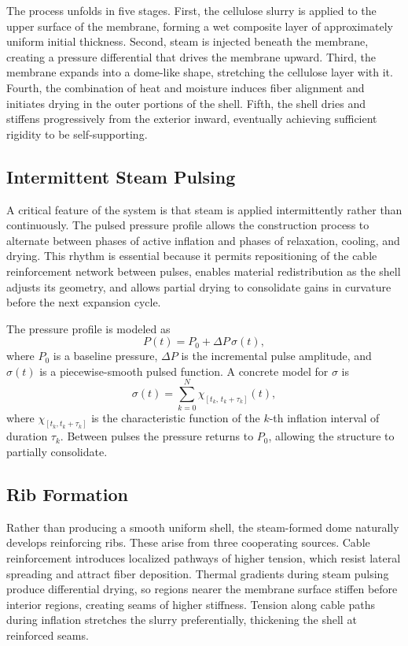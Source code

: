 \documentclass[12pt,a4paper]{article}
\begin{document}
The process unfolds in five stages. First, the cellulose slurry is
applied to the upper surface of the membrane, forming a wet composite
layer of approximately uniform initial thickness. Second, steam is
injected beneath the membrane, creating a pressure differential that
drives the membrane upward. Third, the membrane expands into a
dome-like shape, stretching the cellulose layer with it. Fourth,
the combination of heat and moisture induces fiber alignment and
initiates drying in the outer portions of the shell. Fifth, the shell
dries and stiffens progressively from the exterior inward, eventually
achieving sufficient rigidity to be self-supporting.

\subsection{Intermittent Steam Pulsing}

A critical feature of the system is that steam is applied intermittently
rather than continuously. The pulsed pressure profile allows the
construction process to alternate between phases of active inflation and
phases of relaxation, cooling, and drying. This rhythm is essential
because it permits repositioning of the cable reinforcement network
between pulses, enables material redistribution as the shell adjusts
its geometry, and allows partial drying to consolidate gains in
curvature before the next expansion cycle.

The pressure profile is modeled as
\begin{equation}
P(t) = P_0 + \Delta P\,\sigma(t),
\end{equation}
where $P_0$ is a baseline pressure, $\Delta P$ is the incremental pulse
amplitude, and $\sigma(t)$ is a piecewise-smooth pulsed function. A
concrete model for $\sigma$ is
\begin{equation}
\sigma(t) = \sum_{k=0}^{N} \chi_{[t_k,\,t_k+\tau_k]}(t),
\end{equation}
where $\chi_{[t_k,t_k+\tau_k]}$ is the characteristic function of the
$k$-th inflation interval of duration $\tau_k$. Between pulses the
pressure returns to $P_0$, allowing the structure to partially
consolidate.

\subsection{Rib Formation}

Rather than producing a smooth uniform shell, the steam-formed dome
naturally develops reinforcing ribs. These arise from three cooperating
sources. Cable reinforcement introduces localized pathways of higher
tension, which resist lateral spreading and attract fiber deposition.
Thermal gradients during steam pulsing produce differential drying, so
regions nearer the membrane surface stiffen before interior regions,
creating seams of higher stiffness. Tension along cable paths during
inflation stretches the slurry preferentially, thickening the shell at
reinforced seams.
\end{document}
